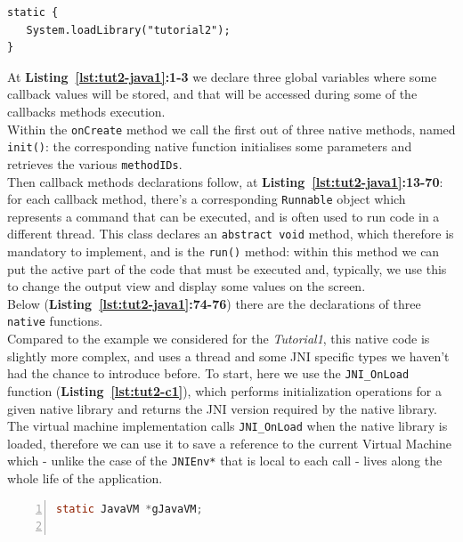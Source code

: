 \documentclass[a4paper,10pt]{article}
\newcommand{\keyword}[1]{\texttt{#1}}
\newcommand{\refl}[1]{\textbf{Listing~\ref{#1}}}
\begin{document}
\begin{multicols}{2}
\begin{lstlisting}
static {
   System.loadLibrary("tutorial2");
}
\end{lstlisting}
At \refl{lst:tut2-java1}\textbf{:1-3} we declare three global variables where some callback values will be stored, and that will be accessed during some of the callbacks methods execution.\\
Within the \keyword{onCreate} method we call the first out of three native methods, named \keyword{init()}: the corresponding native function initialises some parameters and retrieves the various \keyword{methodIDs}.\\
Then callback methods declarations follow, at \refl{lst:tut2-java1}\textbf{:13-70}: for each callback method, there's a corresponding \keyword{Runnable} object which represents a command that can be executed, and is often used to run code in a different thread. This class declares an \keyword{abstract void} method, which therefore is mandatory to implement, and is the \keyword{run()} method: within this method we can put the active part of the code that must be executed and, typically, we use this to change the output view and display some values on the screen.\\
Below (\refl{lst:tut2-java1}\textbf{:74-76}) there are the declarations of three \keyword{native} functions.\\
Compared to the example we considered for the \textit{Tutorial1}, this native code is slightly more complex, and uses a thread and some JNI specific types we haven't had the chance to introduce before. To start, here we use the \keyword{JNI\_OnLoad} function (\refl{lst:tut2-c1}), which performs initialization operations for a given native library and returns the JNI version required by the native library. The virtual machine implementation calls \keyword{JNI\_OnLoad} when the native library is loaded, therefore we can use it to save a reference to the current Virtual Machine which - unlike the case of the \keyword{JNIEnv*} that is local to each call - lives along the whole life of the application.
\begin{lstlisting}[language=C,
				   columns=fullflexible,
				   showstringspaces=false,
				   xleftmargin=15pt,
				   frame = l,
				   numbers=left,
				   commentstyle=\color{gray}\upshape,
				   caption=Part of tutorial2.c - JNI\_OnLoad,
				   label=lst:tut2-c1]
static JavaVM *gJavaVM;				   
				   

\end{lstlisting}
\end{multicols}
\end{document}
